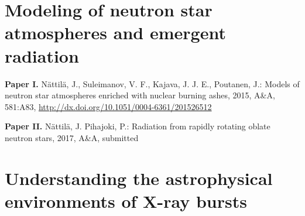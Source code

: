 % 
%
% 
%
%
%
%
%



\vspace{-0.3cm}
\section*{Modeling of neutron star atmospheres and emergent radiation}

\hspace{15pt}\textbf{Paper I.} Nättilä, J., Suleimanov, V. F., Kajava, J. J. E., Poutanen, J.: Models of neutron star atmospheres enriched with nuclear burning ashes, 2015, A\&A, 581:A83, \url{http://dx.doi.org/10.1051/0004-6361/201526512}

\vspace{0.3cm}
\textbf{Paper II.} Nättilä, J. Pihajoki, P.: Radiation from rapidly rotating oblate neutron stars, 2017, A\&A, submitted



\vspace{0.3cm}
\section*{Understanding the astrophysical environments of X-ray bursts}

